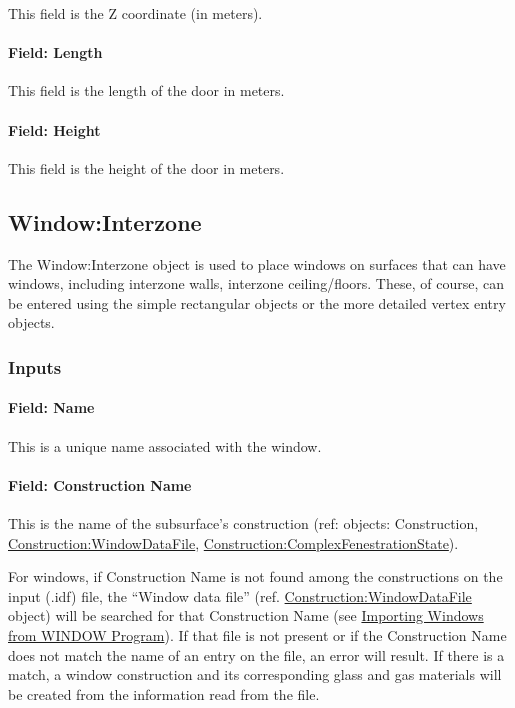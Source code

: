 This field is the Z coordinate (in meters).

\paragraph{Field: Length}\label{field-length-12}

This field is the length of the door in meters.

\paragraph{Field: Height}\label{field-height-6}

This field is the height of the door in meters.

\subsection{Window:Interzone}\label{windowinterzone}

The Window:Interzone object is used to place windows on surfaces that can have windows, including interzone walls, interzone ceiling/floors. These, of course, can be entered using the simple rectangular objects or the more detailed vertex entry objects.

\subsubsection{Inputs}\label{inputs-17-010}

\paragraph{Field: Name}\label{field-name-13-011}

This is a unique name associated with the window.

\paragraph{Field: Construction Name}\label{field-construction-name-13}

This is the name of the subsurface's construction (ref: objects: Construction, \hyperref[constructionwindowdatafile]{Construction:WindowDataFile}, \hyperref[constructioncomplexfenestrationstate]{Construction:ComplexFenestrationState}).

For windows, if Construction Name is not found among the constructions on the input (.idf) file, the ``Window data file'' (ref. \hyperref[constructionwindowdatafile]{Construction:WindowDataFile} object) will be searched for that Construction Name (see \hyperref[importing-windows-from-window-program]{Importing Windows from WINDOW Program}). If that file is not present or if the Construction Name does not match the name of an entry on the file, an error will result. If there is a match, a window construction and its corresponding glass and gas materials will be created from the information read from the file.

